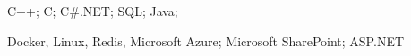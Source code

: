 \begin{cvline}
  \cvsingleline 
    {
      \begin{cvitems}
          \item {C++; C; C\#.NET; SQL; Java;}
          \item {Docker, Linux, Redis, Microsoft Azure; Microsoft SharePoint; ASP.NET}
      \end{cvitems}
    }
\end{cvline}
